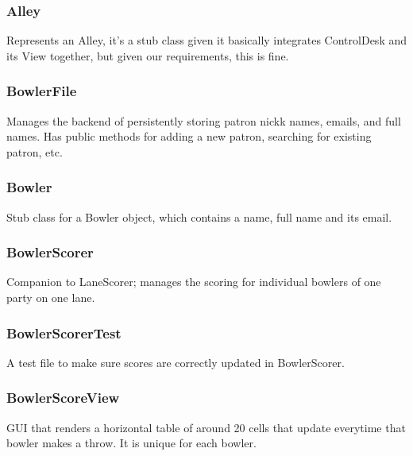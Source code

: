 \subsubsection{Alley}
Represents an Alley, it's a stub class given it basically integrates ControlDesk and its View together, but given our requirements, this is fine.

\subsubsection{BowlerFile}
Manages the backend of persistently storing patron nickk names, emails, and full names. Has public methods for adding a new patron, searching for existing patron, etc.

\subsubsection{Bowler}
Stub class for a Bowler object, which contains a name, full name and its email.

\subsubsection{BowlerScorer}
Companion to LaneScorer; manages the scoring for individual bowlers of one party on one lane.

\subsubsection{BowlerScorerTest}
A test file to make sure scores are correctly updated in BowlerScorer.

\subsubsection{BowlerScoreView}
GUI that renders a horizontal table of around 20 cells that update everytime that bowler makes a throw. It is unique for each bowler.

